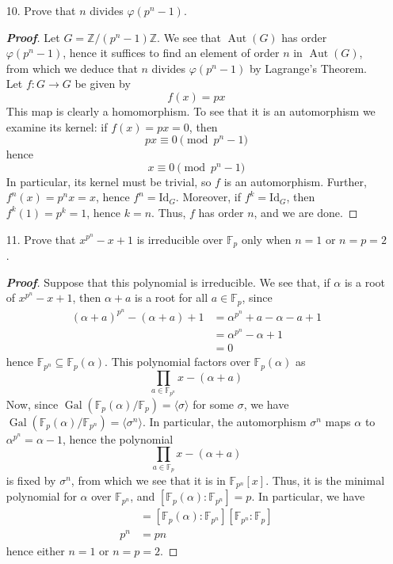 \documentclass[12pt,leqno]{article}
\theoremstyle{definition}
\newcommand{\Gal}{\operatorname{Gal}}
\newcommand{\Aut}{\operatorname{Aut}}
\newcommand{\Z}{\mathbb{Z}}
\newcommand{\F}{\mathbb{F}}
\newcommand{\+}{\oplus}
\newenvironment{Proof}{\begin{proof}[\textnormal{\textbf{Proof}}]}{\end{proof}}
\begin{document}
\begin{enumerate}
\begin{Proof}
In particular, one of 2, 3 and $2\cdot3=6$ must be a perfect square. Clearly then at least one of the polynomials $x^2-2$, $x^2-3$ or $x^2-6$ must have a root in $\F_p$, hence \[(x^2-2)(x^2-3)(x^2-6)=x^6-11x^4+36x^2-36\] has a root modulo $p$ for every prime $p$, however this polynomial clearly has no roots in $\Z$.
    \end{Proof}
   \item [10.] Prove that $n$ divides $\varphi(p^n-1)$. 
    \begin{Proof}
     Let $G=\Z/(p^n-1)\Z$. We see that $\Aut(G)$ has order $\varphi(p^n-1)$, hence it suffices to find an element of order $n$ in $\Aut(G)$, from which we deduce that $n$ divides $\varphi(p^n-1)$ by Lagrange's Theorem. Let $f:G\to G$ be given by \[f(x)=px\] This map is clearly a homomorphism. To see that it is an automorphism we examine its kernel: if $f(x)=px=0$, then \[px\equiv0\pmod{p^n-1}\] hence \[x\equiv0\pmod{p^n-1}\] In particular, its kernel must be trivial, so $f$ is an automorphism. Further, $f^n(x)=p^nx=x$, hence $f^n=\text{Id}_G$. Moreover, if $f^k=\text{Id}_G$, then $f^k(1)=p^k=1$, hence $k=n$. Thus, $f$ has order $n$, and we are done.
    \end{Proof}
   \item [11.] Prove that $x^{p^n}-x+1$ is irreducible over $\F_p$ only when $n=1$ or $n=p=2$. 
    \begin{Proof}
     Suppose that this polynomial is irreducible. We see that, if $\alpha$ is a root of $x^{p^n}-x+1$, then $\alpha+a$ is a root for all $a\in\F_p$, since \begin{align*}(\alpha+a)^{p^n}-(\alpha+a)+1&=\alpha^{p^n}+a-\alpha-a+1\\&=\alpha^{p^n}-\alpha+1\\&=0\end{align*} hence $\F_{p^n}\subseteq\F_p(\alpha)$. This polynomial factors over $\F_p(\alpha)$ as \[\prod_{a\in\F_{p^n}}x-(\alpha+a)\] Now, since $\Gal(\F_p(\alpha)/\F_p)=\langle\sigma\rangle$ for some $\sigma$, we have $\Gal(\F_p(\alpha)/\F_{p^n})=\langle\sigma^n\rangle$. In particular, the automorphism $\sigma^n$ maps $\alpha$ to $\alpha^{p^n}=\alpha-1$, hence the polynomial \[\prod_{a\in\F_p}x-(\alpha+a)\] is fixed by $\sigma^n$, from which we see that it is in $\F_{p^n}[x]$. Thus, it is the minimal polynomial for $\alpha$ over $\F_{p^n}$, and $[\F_p(\alpha):\F_{p^n}]=p$. In particular, we have \begin{align*}[\F_p(\alpha):\F_p]&=[\F_p(\alpha):\F_{p^n}][\F_{p^n}:\F_p]\\p^n&=pn\end{align*} hence either $n=1$ or $n=p=2$. 
    \end{Proof}
  \end{enumerate}
\end{document}
